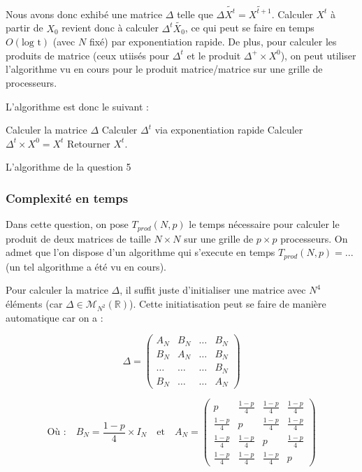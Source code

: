 \documentclass{article}
\begin{document}
Nous avons donc exhibé une matrice $\Delta$ telle que $\Delta \widetilde{X^t} = \widetilde{X^{t+1}}$. Calculer $X^t$ à partir de $X_0$ revient donc à calculer $\Delta^t \widetilde{X_0}$, ce qui peut se faire en temps $O(\text{log t})$ (avec $N$ fixé) par exponentiation rapide. De plus, pour calculer les produits de matrice (ceux utiisés pour $\Delta^t$ et le produit $\Delta^+ \times X^0$), on peut utiliser l'algorithme vu en cours pour le produit matrice/matrice sur une grille de processeurs.

L'algorithme est donc le suivant : \\

\begin{algorithm}[H]
  Calculer la matrice $\Delta$\;
  Calculer $\Delta^t$ via exponentiation rapide\;
  Calculer $\Delta^t \times X^0 = X^t$ \;
  Retourner $X^t$.
 \caption{L'algorithme de la question 5}
\end{algorithm}

\subsubsection*{Complexité en temps}

Dans cette question, on pose $T_{prod}(N,p)$ le temps nécessaire pour calculer le produit de deux matrices de taille $N \times N$ sur une grille de $p \times p$ processeurs. On admet que l'on dispose d'un algorithme qui s'execute en temps $T_{prod}(N,p) = ... $ (un tel algorithme a été vu en cours). %

Pour calculer la matrice $\Delta$, il suffit juste d'initialiser une matrice avec $N^4$ éléments (car $\Delta \in \mathcal{M}_{N^2}(\mathbb{R})$). Cette initiatisation peut se faire de manière automatique car on a : 

$$ \Delta = 
	\left(\begin{array}{c|c|c|c}
    A_N & B_N & \dots & B_N  \\
	\hline
	B_N & A_N & \dots & B_N \\
	\hline
	\dots & \dots & \dots & B_N \\
	\hline
	B_N & \dots & \dots & A_N
	\end{array} \right)$$

$$ \text{Où :} \quad B_N = \frac{1-p}{4} \times I_N \quad \text{et} \quad A_N =
	\begin{pmatrix} p & \frac{1-p}{4} & \frac{1-p}{4} & \frac{1-p}{4} \\
					\frac{1-p}{4} & p & \frac{1-p}{4} & \frac{1-p}{4} \\
					\frac{1-p}{4} & \frac{1-p}{4} & p & \frac{1-p}{4} \\
					\frac{1-p}{4} & \frac{1-p}{4} & \frac{1-p}{4} & p
	 \end{pmatrix}  $$ \\
\end{document}
